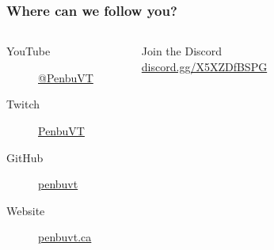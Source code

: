 \documentclass[lualatex,aspectratio=169]{beamer}
\begin{document}
  \begin{frame}
    \frametitle{Where can we follow you?}

    \begin{columns}[T]

      \begin{description}
        \item[YouTube {\color[HTML]{FF0000}\faYoutube}] \href{https://www.youtube.com/@PenbuVT}{@PenbuVT}
        \item[Twitch {\color[HTML]{9146FF}\faTwitch}] \phantom{@}\href{https://twitch.tv/PenbuVT}{PenbuVT}
        \item[GitHub {\color[HTML]{24292F}\faGithub}] \phantom{@}\href{https://github.com/penbuvt}{penbuvt}
        \item[Website {\color[HTML]{0000FF}\faGlobe}] \phantom{@}\href{https://www.penbuvt.ca/}{penbuvt.ca}
      \end{description}


      \begin{figure}
        \centering
        \captionsetup{justification=centering}
        \caption*{Join the Discord {\color[HTML]{5865F2}\faDiscord} \\\href{https://discord.gg/X5XZDfBSPG}{discord.gg/X5XZDfBSPG}}
      \end{figure}
    \end{columns}
  \end{frame}
\end{document}
